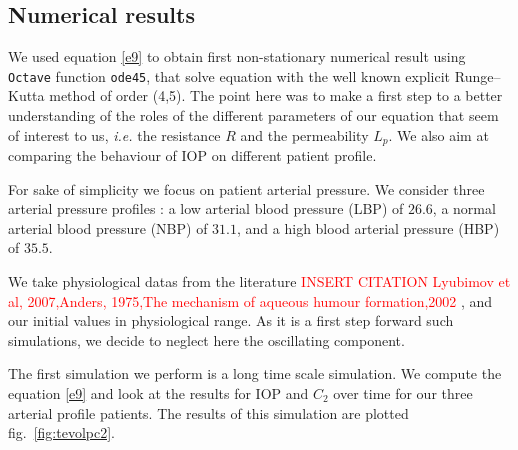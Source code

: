 \subsection{Numerical results}
We used equation \eqref{e9} to obtain first non-stationary numerical result using \texttt{Octave} function \texttt{ode45}, that solve equation with the well known explicit Runge–Kutta method of order (4,5).  The point here was to make a first step to a better understanding of the roles of the different parameters of our equation that seem of interest to us, \textit{i.e.} the resistance $R$ and the permeability $L_p$. We also aim at comparing the behaviour of IOP on different patient profile. 

For sake of simplicity we focus on patient arterial pressure. We consider three arterial pressure profiles : a low arterial blood pressure  (LBP) of $26.6$, a normal arterial blood pressure (NBP) of $31.1$, and a high blood arterial pressure (HBP) of $35.5$.

We take physiological datas from the literature \textcolor{red}{INSERT CITATION Lyubimov et al, 2007,Anders, 1975,The mechanism of aqueous humour
formation,2002 \cite{??}}, and our initial values in physiological range. As it is a first step forward such simulations, we decide to neglect here the oscillating component. 

The first simulation we perform is a long time scale simulation. We compute the equation \eqref{e9} and look at the results for IOP and $C_2$ over time for our three arterial profile patients. The results of this simulation are plotted fig.~\ref{fig:tevolpc2}.

